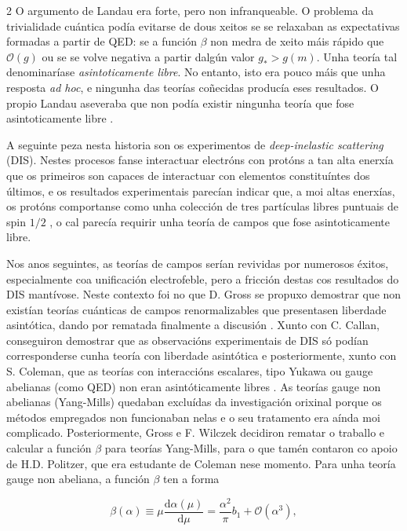 \begin{multicols}{2}
O argumento de Landau era forte, pero non infranqueable. O problema da
trivialidade cuántica podía evitarse de dous xeitos se se relaxaban as
expectativas formadas a partir de QED: se a función $\beta$ non medra de xeito
máis rápido que $\mathcal{O}(g)$ ou se se volve negativa a partir dalgún valor
$g_* > g(m)$. Unha teoría tal denominaríase \textit{asintoticamente libre}. No
entanto, isto era pouco máis que unha resposta \textit{ad hoc}, e ningunha das
teorías coñecidas producía eses resultados. O propio Landau aseveraba que non
podía existir ningunha teoría que fose asintoticamente libre \cite{Landau2}.

A seguinte peza nesta historia son os experimentos de \textit{deep-inelastic
scattering} (DIS). Nestes procesos fanse interactuar electróns con protóns a
tan alta enerxía que os primeiros son capaces de interactuar con elementos
constituíntes dos últimos, e os resultados experimentais parecían indicar que,
a moi altas enerxías, os protóns comportanse como unha colección de tres
partículas libres puntuais de spin $1/2$ \cite{DIS1, DIS2}, o cal parecía
requirir unha teoría de campos que fose asintoticamente libre.

Nos anos seguintes, as teorías de campos serían revividas por numerosos éxitos,
especialmente coa unificación electrofeble, pero a fricción destas cos
resultados do DIS mantívose. Neste contexto foi no que D. Gross se propuxo
demostrar que non existían teorías cuánticas de campos renormalizables que
presentasen liberdade asintótica, dando por rematada finalmente a discusión
\cite{GrossNobel}. Xunto con C. Callan, conseguiron demostrar que as
observacións experimentais de DIS só podían corresponderse cunha teoría con
liberdade asintótica \cite{GrossCallan} e posteriormente, xunto con S. Coleman,
que as teorías con interaccións escalares, tipo Yukawa ou gauge abelianas (como
QED) non eran asintóticamente libres \cite{GrossColeman}. As teorías gauge non
abelianas (Yang-Mills) quedaban excluídas da investigación orixinal porque os
métodos empregados non funcionaban nelas e o seu tratamento era aínda moi
complicado. Posteriormente, Gross e F. Wilczek decidiron rematar o traballo e
calcular a función $\beta$ para teorías Yang-Mills, para o que tamén contaron
co apoio de H.D. Politzer, que era estudante de Coleman nese momento. Para unha
teoría gauge non abeliana, a función $\beta$ ten a forma

\begin{equation}
    \beta(\alpha) \equiv \mu \frac{\text{d}\alpha(\mu)}{\text{d}\mu}
    = \frac{\alpha^2}{\pi} b_1 + \mathcal{O}(\alpha^3),
\end{equation}


\end{multicols}
